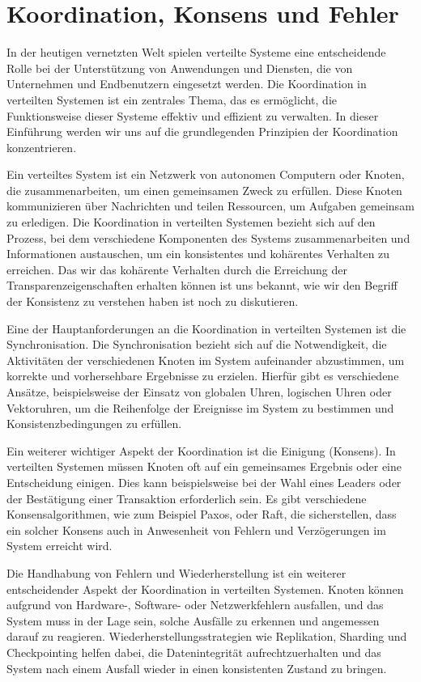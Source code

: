 \section{Koordination, Konsens und Fehler}

In der heutigen vernetzten Welt spielen verteilte Systeme eine entscheidende Rolle bei der Unterstützung von Anwendungen und Diensten, die von Unternehmen und Endbenutzern eingesetzt werden. Die Koordination in verteilten Systemen ist ein zentrales Thema, das es ermöglicht, die Funktionsweise dieser Systeme effektiv und effizient zu verwalten. In dieser Einführung werden wir uns auf die grundlegenden Prinzipien der Koordination konzentrieren.

Ein verteiltes System ist ein Netzwerk von autonomen Computern oder Knoten, die zusammenarbeiten, um einen gemeinsamen Zweck zu erfüllen. Diese Knoten kommunizieren über Nachrichten und teilen Ressourcen, um Aufgaben gemeinsam zu erledigen. Die Koordination in verteilten Systemen bezieht sich auf den Prozess, bei dem verschiedene Komponenten des Systems zusammenarbeiten und Informationen austauschen, um ein konsistentes und kohärentes Verhalten zu erreichen. Das wir das kohärente Verhalten durch die Erreichung der Transparenzeigenschaften erhalten können ist uns bekannt, wie wir den Begriff der Konsistenz zu verstehen haben ist noch zu diskutieren. 

Eine der Hauptanforderungen an die Koordination in verteilten Systemen ist die Synchronisation. Die Synchronisation bezieht sich auf die Notwendigkeit, die Aktivitäten der verschiedenen Knoten im System aufeinander abzustimmen, um korrekte und vorhersehbare Ergebnisse zu erzielen. Hierfür gibt es verschiedene Ansätze, beispielsweise der Einsatz von globalen Uhren, logischen Uhren oder Vektoruhren, um die Reihenfolge der Ereignisse im System zu bestimmen und Konsistenzbedingungen zu erfüllen.

Ein weiterer wichtiger Aspekt der Koordination ist die Einigung (Konsens). In verteilten Systemen müssen Knoten oft auf ein gemeinsames Ergebnis oder eine Entscheidung einigen. Dies kann beispielsweise bei der Wahl eines Leaders oder der Bestätigung einer Transaktion erforderlich sein. Es gibt verschiedene Konsensalgorithmen, wie zum Beispiel Paxos, oder Raft, die sicherstellen, dass ein solcher Konsens auch in Anwesenheit von Fehlern und Verzögerungen im System erreicht wird.

Die Handhabung von Fehlern und Wiederherstellung ist ein weiterer entscheidender Aspekt der Koordination in verteilten Systemen. Knoten können aufgrund von Hardware-, Software- oder Netzwerkfehlern ausfallen, und das System muss in der Lage sein, solche Ausfälle zu erkennen und angemessen darauf zu reagieren. Wiederherstellungsstrategien wie Replikation, Sharding und Checkpointing helfen dabei, die Datenintegrität aufrechtzuerhalten und das System nach einem Ausfall wieder in einen konsistenten Zustand zu bringen.

